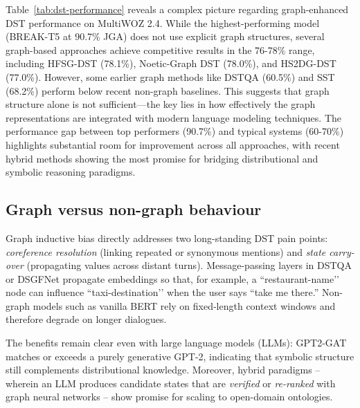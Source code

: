 \documentclass[11pt]{article}
\begin{document}
Table~\ref{tab:dst-performance} reveals a complex picture regarding graph-enhanced DST performance on MultiWOZ 2.4. While the highest-performing model (BREAK-T5 at 90.7\% JGA) does not use explicit graph structures, several graph-based approaches achieve competitive results in the 76-78\% range, including HFSG-DST (78.1\%), Noetic-Graph DST (78.0\%), and HS2DG-DST (77.0\%). However, some earlier graph methods like DSTQA (60.5\%) and SST (68.2\%) perform below recent non-graph baselines. This suggests that graph structure alone is not sufficient—the key lies in how effectively the graph representations are integrated with modern language modeling techniques. The performance gap between top performers (90.7\%) and typical systems (60-70\%) highlights substantial room for improvement across all approaches, with recent hybrid methods showing the most promise for bridging distributional and symbolic reasoning paradigms. 

\subsection{Graph versus non-graph behaviour}
Graph inductive bias directly addresses two long-standing DST pain points: \emph{coreference resolution} (linking repeated or synonymous mentions) and \emph{state carry-over} (propagating values across distant turns). Message-passing layers in DSTQA or DSGFNet propagate embeddings so that, for example, a ``restaurant-name’’ node can influence ``taxi-destination’’ when the user says “take me there.”  Non-graph models such as vanilla BERT rely on fixed‐length context windows and therefore degrade on longer dialogues.

The benefits remain clear even with large language models (LLMs): GPT2-GAT matches or exceeds a purely generative GPT-2, indicating that symbolic structure still complements distributional knowledge.  Moreover, hybrid paradigms – wherein an LLM produces candidate states that are \emph{verified} or \emph{re-ranked} with graph neural networks – show promise for scaling to open-domain ontologies.
\end{document}
